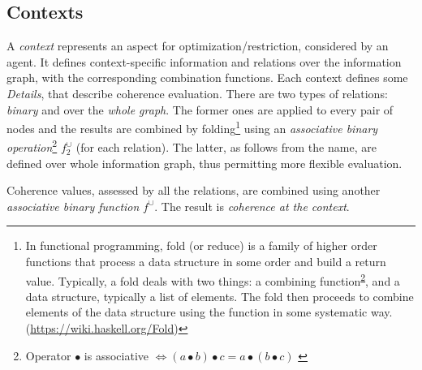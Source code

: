 \documentclass[../ThesisDoc]{subfiles}
\begin{document}
\providecommand{\rootdir}{..}


\subsection{Contexts}
\label{sec:solution-contexts}


A \emph{context} represents an aspect for optimization/restriction, considered
by an agent. It defines context-specific information and relations over the
information graph, with the corresponding combination functions.
Each context defines some \emph{Details}, that describe coherence evaluation.
There are two types of relations: \emph{binary} and over the \emph{whole graph}.
The former ones are applied to every pair of nodes and the results are combined
by folding\footnote{
  In functional programming, fold (or reduce) is a family of higher order
  functions that process a data structure in some order and build a return value.
  Typically, a fold deals with two things: a combining
  function\textsuperscript{\ref{footnote:binary-operation}},
  and a data structure, typically a list of elements.
  The fold then proceeds to combine elements of the data structure using
  the function in some systematic way. (\url{https://wiki.haskell.org/Fold})
} using an \emph{associative binary operation}\footnote{%
  Operator $\bullet$ is associative
  $\Leftrightarrow (a \bullet b) \bullet c = a \bullet (b \bullet c)$
    \label{footnote:binary-operation}
} $f^\cup_2$ (for each relation).
The latter, as follows from the name, are defined over whole information graph,
thus permitting more flexible evaluation.

Coherence values, assessed by all the relations, are combined using another
\emph{associative binary function} $f^\cup$.
The result is \emph{coherence at the context}.
\end{document}
